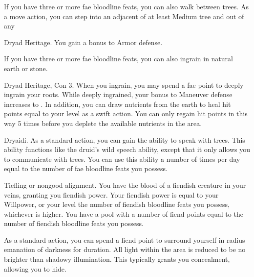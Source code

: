 If you have three or more fae bloodline feats, you can also walk between trees. As a move action, you can step into an adjacent of at least Medium tree and out of any 

\featpre Dryad Heritage.
\featben You gain a  bonus to Armor defense.

If you have three or more fae bloodline feats, you can also ingrain in natural earth or stone.

\featpres Dryad Heritage, Con 3.
\featben When you ingrain, you may spend a fae point to deeply ingrain your roots. While deeply ingrained, your bonus to Maneuver defense increases to . In addition, you can draw nutrients from the earth to heal hit points equal to your level as a swift action. You can only regain hit points in this way 5 times before you deplete the available nutrients in the area. 

\featpre Dryaidi.
\featben As a standard action, you can gain the ability to speak with trees. This ability functions like the druid's wild speech ability, except that it only allows you to communicate with trees. You can use this ability a number of times per day equal to the number of fae bloodline feats you possess.

\featpre Tiefling or nongood alignment.
\featben You have the blood of a fiendish creature in your veins, granting you fiendish power.
Your fiendish power is equal to your Willpower, or your level \add the number of fiendish bloodline feats you possess, whichever is higher.
You have a pool with a number of fiend points equal to the number of fiendish bloodline feats you possess.

As a standard action, you can spend a fiend point to surround yourself in \areamed radius emanation of darkness for \durshort duration.
All light within the area is reduced to be no brighter than shadowy illumination.
This typically grants you concealment, allowing you to hide.
